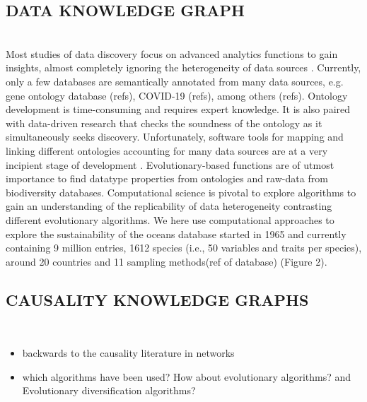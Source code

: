 \documentclass[12pt,a4paper]{article}
\begin{document}
\subsection{DATA KNOWLEDGE GRAPH}
\\
Most studies of data discovery focus on advanced analytics functions to gain insights, almost completely ignoring the heterogeneity of data sources \citep{azeroual2019solving}. Currently, only a few databases are semantically annotated from many data sources, e.g. gene ontology database (refs), COVID-19 (refs), among others (refs). Ontology development is time-consuming and requires expert knowledge. It is also paired with data-driven research that checks the soundness of the ontology as it simultaneously seeks discovery. Unfortunately, software tools for mapping and linking different ontologies accounting for many data sources are at a very incipient stage of development \cite{nsf,KGcovid19,Oavida}. Evolutionary-based functions are of utmost importance to find datatype properties from ontologies and raw-data from biodiversity databases. Computational science is pivotal to explore algorithms to gain an understanding of the replicability of data heterogeneity contrasting different evolutionary algorithms. We here use computational approaches to explore the sustainability of the oceans database started in 1965 and currently containing 9 million entries, 1612 species (i.e., 50 variables and traits per species), around 20 countries and 11 sampling methods(ref of database) (Figure 2).

\subsection{CAUSALITY KNOWLEDGE GRAPHS}
\\
\begin{itemize}
    \item backwards to the causality literature in networks
    \item which algorithms have been used? How about evolutionary algorithms? and Evolutionary diversification algorithms?
\end{itemize}
\end{document}
